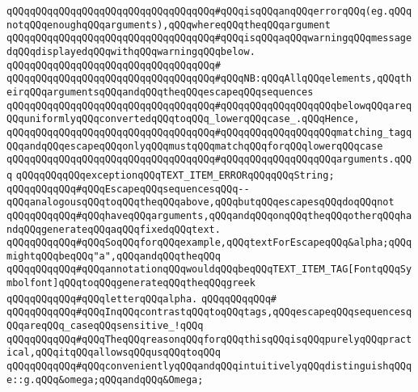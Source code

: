 \verb|qQQqqQQqqQQqqQQqqQQqqQQqqQQqqQQqqQQq#qQQqisqQQqanqQQqerrorqQQq(eg.qQQqnotqQQqenoughqQQqarguments),qQQqwhereqQQqtheqQQqargument|\newline
\verb|qQQqqQQqqQQqqQQqqQQqqQQqqQQqqQQqqQQq#qQQqisqQQqaqQQqwarningqQQqmessagedqQQqdisplayedqQQqwithqQQqwarningqQQqbelow.|\newline
\verb|qQQqqQQqqQQqqQQqqQQqqQQqqQQqqQQqqQQq#|\newline
\verb|qQQqqQQqqQQqqQQqqQQqqQQqqQQqqQQqqQQq#qQQqNB:qQQqAllqQQqelements,qQQqtheirqQQqargumentsqQQqandqQQqtheqQQqescapeqQQqsequences|\newline
\verb|qQQqqQQqqQQqqQQqqQQqqQQqqQQqqQQqqQQq#qQQqqQQqqQQqqQQqqQQqbelowqQQqareqQQquniformlyqQQqconvertedqQQqtoqQQq_lowerqQQqcase_.qQQqHence,|\newline
\verb|qQQqqQQqqQQqqQQqqQQqqQQqqQQqqQQqqQQq#qQQqqQQqqQQqqQQqqQQqmatching_tagqQQqandqQQqescapeqQQqonlyqQQqmustqQQqmatchqQQqforqQQqlowerqQQqcase|\newline
\verb|qQQqqQQqqQQqqQQqqQQqqQQqqQQqqQQqqQQq#qQQqqQQqqQQqqQQqqQQqarguments.qQQq|\newline
\newline
\newline
\verb|qQQqqQQqqQQqexceptionqQQqTEXT_ITEM_ERRORqQQqqQQqString;|\newline
\newline
\verb|qQQqqQQqqQQq#qQQqEscapeqQQqsequencesqQQq--qQQqanalogousqQQqtoqQQqtheqQQqabove,qQQqbutqQQqescapesqQQqdoqQQqnot|\newline
\verb|qQQqqQQqqQQq#qQQqhaveqQQqarguments,qQQqandqQQqonqQQqtheqQQqotherqQQqhandqQQqgenerateqQQqaqQQqfixedqQQqtext.|\newline
\verb|qQQqqQQqqQQq#qQQqSoqQQqforqQQqexample,qQQqtextForEscapeqQQq&alpha;qQQqmightqQQqbeqQQq"a",qQQqandqQQqtheqQQq|\newline
\verb|qQQqqQQqqQQq#qQQqannotationqQQqwouldqQQqbeqQQqTEXT_ITEM_TAG[FontqQQqSymbolfont]qQQqtoqQQqgenerateqQQqtheqQQqgreek|\newline
\verb|qQQqqQQqqQQq#qQQqletterqQQqalpha.|\newline
\verb|qQQqqQQqqQQq#|\newline
\verb|qQQqqQQqqQQq#qQQqInqQQqcontrastqQQqtoqQQqtags,qQQqescapeqQQqsequencesqQQqareqQQq_caseqQQqsensitive_!qQQq|\newline
\verb|qQQqqQQqqQQq#qQQqTheqQQqreasonqQQqforqQQqthisqQQqisqQQqpurelyqQQqpractical,qQQqitqQQqallowsqQQqusqQQqtoqQQq|\newline
\verb|qQQqqQQqqQQq#qQQqconvenientlyqQQqandqQQqintuitivelyqQQqdistinguishqQQqe::g.qQQq&omega;qQQqandqQQq&Omega;|\newline
